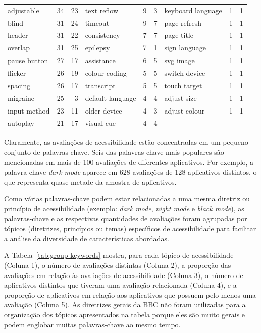 \begin{table}[!htb]
\begin{tabular}{lrr||lrr||lrr}
adjustable       & 34      & 23   & text reflow      & 9       & 3    & keyboard language  & 1       & 1    \\
blind            & 31      & 24   & timeout          & 9       & 7    & page refresh       & 1       & 1    \\
header           & 31      & 22   & consistency      & 7       & 7    & page title         & 1       & 1    \\
overlap          & 31      & 25   & epilepsy         & 7       & 1    & sign language      & 1       & 1    \\
pause button     & 27      & 17   & assistance       & 6       & 5    & svg image          & 1       & 1    \\
flicker          & 26      & 19   & colour coding    & 5       & 5    & switch device      & 1       & 1    \\
spacing          & 26      & 17   & transcript       & 5       & 5    & touch target       & 1       & 1    \\
migraine         & 25      & 3    & default language & 4       & 4    & adjust size        & 1       & 1    \\
input method     & 23      & 11   & older device     & 4       & 3    & adjust colour      & 1       & 1    \\
autoplay         & 21      & 17   & visual cue       & 4       & 4    &                    &         &     \\
\hline
\end{tabular}
\end{table}

Claramente, as avaliações de acessibilidade estão concentradas em um pequeno conjunto de palavras-chave. Seis das palavras-chave mais populares são mencionadas em mais de 100 avaliações de diferentes aplicativos. Por exemplo, a palavra-chave \textit{dark mode} aparece em 628 avaliações de 128 aplicativos distintos, o que representa quase metade da amostra de aplicativos.

Como várias palavras-chave podem estar relacionadas a uma mesma diretriz ou princípio de acessibilidade (exemplo: \textit{dark mode}, \textit{night mode} e \textit{black mode}), 
as palavras-chave e as respectivas quantidades de avaliações foram agrupadas por tópicos (diretrizes, princípios ou temas) específicos de acessibilidade para facilitar a análise da diversidade de características abordadas.

A Tabela~\ref{tab:group-keywords} mostra, para cada tópico de acessibilidade (Coluna 1), o número de avaliações distintas (Coluna 2), a proporção das avaliações em relação às avaliações de acessibilidade (Coluna 3), o número de aplicativos distintos que tiveram uma avaliação relacionada (Coluna 4), e a proporção de aplicativos em relação aos aplicativos que possuem pelo menos uma avaliação (Coluna 5).
As diretrizes gerais da BBC não foram utilizadas para a organização dos tópicos apresentados na tabela porque eles são muito gerais e podem englobar muitas palavras-chave ao mesmo tempo.

